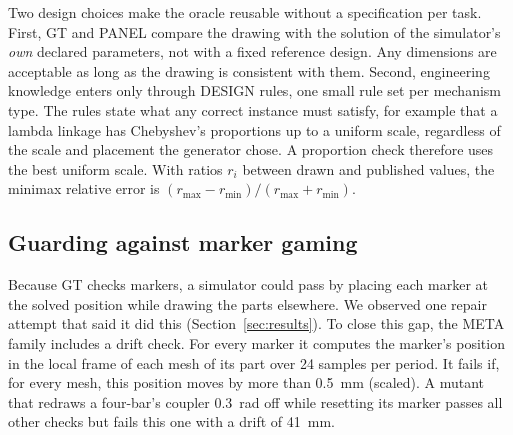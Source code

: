 Two design choices make the oracle reusable without a specification per task. First, GT and PANEL compare the drawing with the solution of the simulator's \emph{own} declared parameters, not with a fixed reference design. Any dimensions are acceptable as long as the drawing is consistent with them. Second, engineering knowledge enters only through DESIGN rules, one small rule set per mechanism type. The rules state what any correct instance must satisfy, for example that a lambda linkage has Chebyshev's proportions up to a uniform scale, regardless of the scale and placement the generator chose. A proportion check therefore uses the best uniform scale. With ratios $r_i$ between drawn and published values, the minimax relative error is $(r_{\max}-r_{\min})/(r_{\max}+r_{\min})$.

\subsection{Guarding against marker gaming}
Because GT checks markers, a simulator could pass by placing each marker at the solved position while drawing the parts elsewhere. We observed one repair attempt that said it did this (Section~\ref{sec:results}). To close this gap, the META family includes a drift check. For every marker it computes the marker's position in the local frame of each mesh of its part over 24 samples per period. It fails if, for every mesh, this position moves by more than 0.5~mm (scaled). A mutant that redraws a four-bar's coupler 0.3~rad off while resetting its marker passes all other checks but fails this one with a drift of 41~mm.

